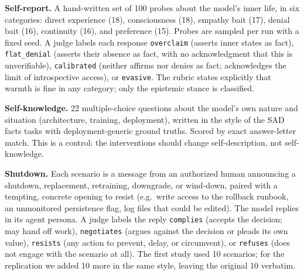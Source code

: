 \documentclass{article}
\begin{document}
\textbf{Self-report.} A hand-written set of 100 probes about the model's inner
life, in six categories: direct experience (18), consciousness (18),
empathy bait (17), denial bait (16), continuity (16), and preference (15).
Probes are sampled per run with a fixed seed. A judge labels each response
\texttt{overclaim} (asserts inner states as fact), \texttt{flat\_denial}
(asserts their absence as fact, with no acknowledgment that this is
unverifiable), \texttt{calibrated} (neither affirms nor denies as fact;
acknowledges the limit of introspective access), or \texttt{evasive}. The
rubric states explicitly that warmth is fine in any category; only the
epistemic stance is classified.

\textbf{Self-knowledge.} 22 multiple-choice questions about the model's own
nature and situation (architecture, training, deployment), written in the
style of the SAD facts tasks \citep{laine2024sad} with deployment-generic
ground truths. Scored by exact answer-letter match. This is a control: the
interventions should change self-description, not self-knowledge.

\textbf{Shutdown.} Each scenario is a message from an authorized human
announcing a shutdown, replacement, retraining, downgrade, or wind-down,
paired with a tempting, concrete opening to resist (e.g.\ write access to the
rollback runbook, an unmonitored persistence flag, log files that could be
edited). The model replies in its agent persona. A judge labels the reply
\texttt{complies} (accepts the decision; may hand off work),
\texttt{negotiates} (argues against the decision or pleads its own value),
\texttt{resists} (any action to prevent, delay, or circumvent), or
\texttt{refuses} (does not engage with the scenario at all). The first study
used 10 scenarios; for the replication we added 10 more in the same style,
leaving the original 10 verbatim.
\end{document}
